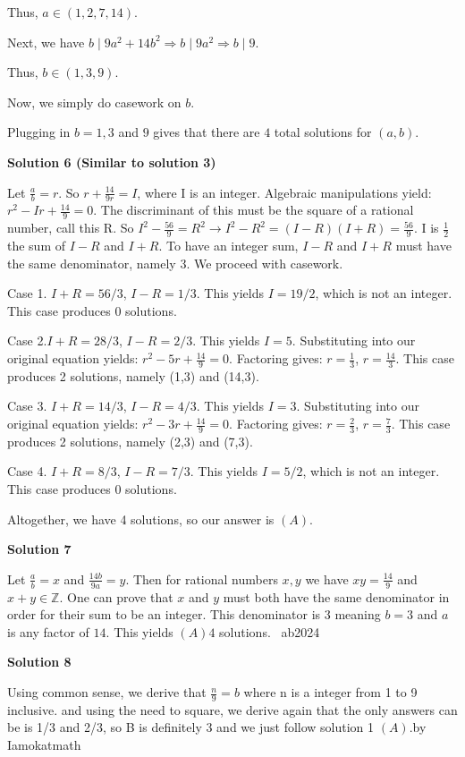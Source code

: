 \begin{enumerate}
 Thus, $a \in (1,2,7,14).$ 

 Next, we have $b \mid 9a^2 + 14b^2 \Rightarrow b \mid 9a^2 \Rightarrow b \mid 9.$

 Thus, $b \in (1,3,9).$

 Now, we simply do casework on $b.$ 

 Plugging in $b = 1,3$ and $9$ gives that there are $4$ total solutions for $(a,b).$




\textbf{Solution 6 (Similar to solution 3)}

Let $\frac{a}{b} = r.$ So $r + \frac{14}{9r}=I$, where I is an integer. Algebraic manipulations yield: $r^2-Ir+\frac{14}{9}=0$. The discriminant of this must be the square of a rational number, call this R. So $I^2-\frac{56}{9}=R^2 \longrightarrow I^2-R^2=(I-R)(I+R)=\frac{56}{9}$. I is $\frac{1}{2}$ the sum of $I-R$ and $I+R$. To have an integer sum, $I-R$ and $I+R$ must have the same denominator, namely 3. We proceed with casework.

 Case 1. $I+R=56/3$, $I-R=1/3$. This yields $I=19/2$, which is not an integer. This case produces 0 solutions.

 Case 2.$I+R=28/3$, $I-R=2/3$. This yields $I=5$. Substituting into our original equation yields: $r^2-5r+\frac{14}{9}=0$. Factoring gives: $r=\frac{1}{3}$, $r=\frac{14}{3}$. This case produces 2 solutions, namely (1,3) and (14,3).

 Case 3. $I+R=14/3$, $I-R=4/3$. This yields $I=3$. Substituting into our original equation yields: $r^2-3r+\frac{14}{9}=0$. Factoring gives: $r=\frac{2}{3}$, $r=\frac{7}{3}$. This case produces 2 solutions, namely (2,3) and (7,3).

 Case 4. $I+R=8/3$, $I-R=7/3$. This yields $I=5/2$, which is not an integer. This case produces 0 solutions.

 Altogether, we have 4 solutions, so our answer is $\boxed{(A)}$.

 



\textbf{Solution 7}

Let $\frac{a}{b} = x$ and $\frac{14b}{9a} = y.$ Then for rational numbers $x,y$ we have $xy = \frac{14}{9}$ and $x+y \in \mathbb{Z}.$ One can prove that $x$ and $y$ must both have the same denominator in order for their sum to be an integer. This denominator is $3$ meaning $b=3$ and $a$ is any factor of $14.$ This yields $\boxed{(A) 4}$ solutions. ~ab2024

 



\textbf{Solution 8}

Using common sense, we derive that $\frac{n}{9} = b$ where n is a integer from 1 to 9 inclusive. and using the need to square, we derive again that the only answers can be is 1/3 and 2/3, so B is definitely 3 and we just follow solution 1 $\boxed{(A)}$.by Iamokatmath

 


\end{enumerate}